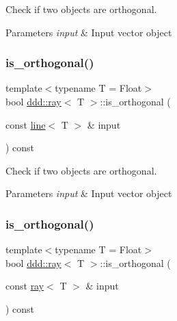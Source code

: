 Check if two objects are orthogonal. 


\begin{DoxyParams}{Parameters}
{\em input} & Input vector object \\
\hline
\end{DoxyParams}
\mbox{\label{classddd_1_1ray_a688a8099b97cf4b91df488a5679c386a}} 
\subsubsection{\texorpdfstring{is\+\_\+orthogonal()}{is\_orthogonal()}\hspace{0.1cm}{\footnotesize\ttfamily [2/5]}}
{\footnotesize\ttfamily template$<$typename T = Float$>$ \\
bool \hyperlink{classddd_1_1ray}{ddd\+::ray}$<$ T $>$\+::is\+\_\+orthogonal (\begin{DoxyParamCaption}\item[{const \hyperlink{classddd_1_1line}{line}$<$ T $>$ \&}]{input }\end{DoxyParamCaption}) const\hspace{0.3cm}{\ttfamily [inline]}}



Check if two objects are orthogonal. 


\begin{DoxyParams}{Parameters}
{\em input} & Input vector object \\
\hline
\end{DoxyParams}
\mbox{\label{classddd_1_1ray_a669c71b72c7222adae9fab86795e7305}} 
\subsubsection{\texorpdfstring{is\+\_\+orthogonal()}{is\_orthogonal()}\hspace{0.1cm}{\footnotesize\ttfamily [3/5]}}
{\footnotesize\ttfamily template$<$typename T = Float$>$ \\
bool \hyperlink{classddd_1_1ray}{ddd\+::ray}$<$ T $>$\+::is\+\_\+orthogonal (\begin{DoxyParamCaption}\item[{const \hyperlink{classddd_1_1ray}{ray}$<$ T $>$ \&}]{input }\end{DoxyParamCaption}) const\hspace{0.3cm}{\ttfamily [inline]}}




